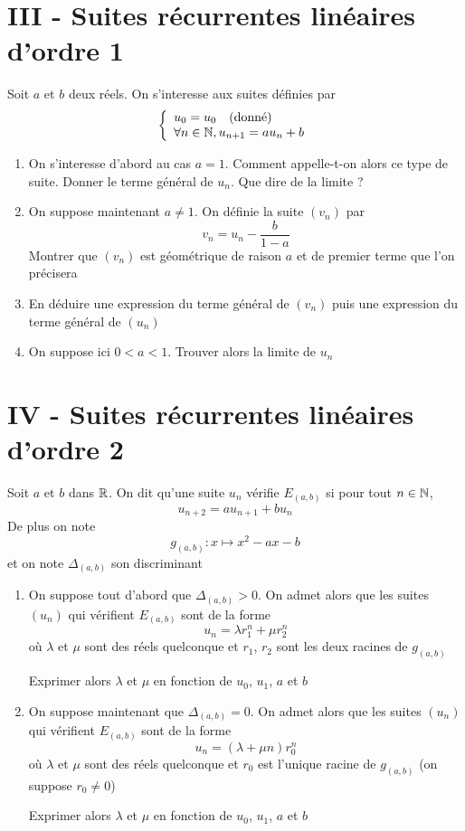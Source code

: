 \section*{III - Suites récurrentes linéaires d'ordre 1}
Soit $a$ et $b$ deux réels. On s'interesse aux suites définies par $$\left\lbrace \begin{array}{l}
u_0 = u_0 \quad (\text{donné})\\
\forall n \in \mathbb{N}, u_{n+1} = au_n +b
\end{array}
\right.$$
\begin{enumerate}
\item On s'interesse d'abord au cas $a=1$. Comment appelle-t-on alors ce type de suite. Donner le terme général de $u_n$. Que dire de la limite ?
\item On suppose maintenant $a\neq 1$. On définie la suite $(v_n)$ par $$v_n = u_n - \dfrac{b}{1-a}$$
Montrer que $(v_n)$ est géométrique de raison $a$ et de premier terme que l'on précisera
\item En déduire une expression du terme général de $(v_n)$ puis une expression du terme général de $(u_n)$
\item On suppose ici $0 < a < 1$. Trouver alors la limite de $u_n$ 
\end{enumerate}
\section*{IV - Suites récurrentes linéaires d'ordre 2}
Soit $a$ et $b$ dans $\mathbb{R}$. On dit qu'une suite $u_n$ vérifie $E_{(a,b)}$ si pour tout $n\in \mathbb{N}$, 
$$u_{n+2} = au_{n+1} + bu_n$$
De plus on note 
$$g_{(a,b)} : x\mapsto x^2-ax-b$$ et on note $\Delta_{(a,b)}$ son discriminant
\begin{enumerate}
\item On suppose tout d'abord que $\Delta_{(a,b)} > 0$. On admet alors que les suites $(u_n)$ qui vérifient $E_{(a,b)}$ sont de la forme 
$$u_n = \lambda r_1^n + \mu r_2^n $$
où $\lambda$ et $\mu$ sont des réels quelconque et $r_1$, $r_2$ sont les deux racines de $g_{(a,b)}$\newline


Exprimer alors $\lambda$ et $\mu$ en fonction de $u_0$, $u_1$, $a$ et $b$
\item On suppose maintenant que $\Delta_{(a,b)} = 0$. On admet alors que les suites $(u_n)$ qui vérifient $E_{(a,b)}$ sont de la forme 
$$u_n = (\lambda + \mu n)r_0^n $$
où $\lambda$ et $\mu$ sont des réels quelconque et $r_0$ est l'unique racine de $g_{(a,b)}$ (on suppose $r_0 \neq 0$)\newline


Exprimer alors $\lambda$ et $\mu$ en fonction de $u_0$, $u_1$, $a$ et $b$
\end{enumerate}
